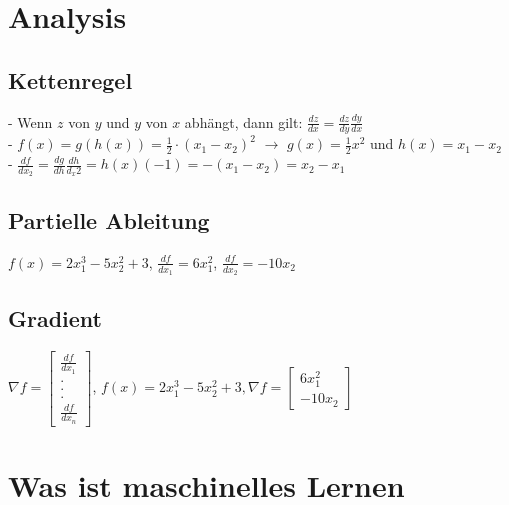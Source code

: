 \documentclass{report}
\begin{document}
  
  \section{Analysis}	
  \subsection{Kettenregel}	
  - Wenn $z$ von $y$ und $y$ von $x$ abhängt, dann gilt: $\frac{dz}{dx} = \frac{dz}{dy}\frac{dy}{dx}$\\	
  - $f(x) = g(h(x)) = \frac{1}{2}\cdot(x_1 - x_2)^2$ $\rightarrow$ $g(x) = \frac{1}{2}x^2$ und $h(x) = x_1 - x_2$\\	
  - $\frac{df}{dx_2} = \frac{dg}{dh}\frac{dh}{d_x2} = h(x)(-1) = -(x_1 - x_2) = x_2 - x_1$	
  \subsection{Partielle Ableitung}	
  $f(x) = 2x_1^3 - 5x_2^2 + 3$, $\frac{df}{dx_1} = 6x_1^2$, $\frac{df}{dx_2} = -10x_2$	
  \subsection{Gradient}	
  $\nabla f = \begin{bmatrix}\frac{df}{dx_1}\\ . \\. \\.\\\frac{df}{dx_n}\end{bmatrix}$, $f(x) = 2x_1^3 - 5x_2^2 + 3, \nabla f = \begin{bmatrix}6x_1^2\\-10x_2\end{bmatrix}$	
  
  \section{Was ist maschinelles Lernen}	
\end{document}
